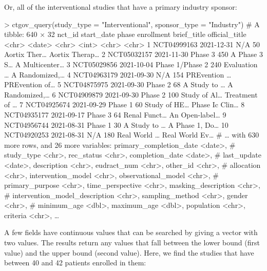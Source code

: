 Or, all of the interventional studies that have a primary industry sponsor:

\begin{example}
> ctgov_query(study_type = "Interventional", sponsor_type = "Industry")
# A tibble: 640 × 32
   nct_id      start_date phase           enrollment brief_title  official_title
   <chr>       <date>     <chr>                <int> <chr>        <chr>
 1 NCT04999163 2021-12-31 N/A                     50 Aortix Ther… Aortix Therap…
 2 NCT05032157 2021-11-30 Phase 3                450 A Phase 3 S… A Multicenter…
 3 NCT05029856 2021-10-04 Phase 1/Phase 2        240 Evaluation … A Randomized,…
 4 NCT04963179 2021-09-30 N/A                    154 PREvention … PREvention of…
 5 NCT04875975 2021-09-30 Phase 2                 68 A Study to … A Randomized,…
 6 NCT04909879 2021-09-30 Phase 2                100 Study of Al… Treatment of …
 7 NCT04925674 2021-09-29 Phase 1                 60 Study of HE… Phase Ic Clin…
 8 NCT04935177 2021-09-17 Phase 3                 64 Renal Funct… An Open-label…
 9 NCT04956744 2021-08-31 Phase 1                 30 A Study to … A Phase 1, Do…
10 NCT04920253 2021-08-31 N/A                    180 Real World … Real World Ev…
# … with 630 more rows, and 26 more variables: primary_completion_date <date>,
#   study_type <chr>, rec_status <chr>, completion_date <date>,
#   last_update <date>, description <chr>, eudract_num <chr>, other_id <chr>,
#   allocation <chr>, intervention_model <chr>, observational_model <chr>,
#   primary_purpose <chr>, time_perspective <chr>, masking_description <chr>,
#   intervention_model_description <chr>, sampling_method <chr>, gender <chr>,
#   minimum_age <dbl>, maximum_age <dbl>, population <chr>, criteria <chr>, …
\end{example}

A few fields have continuous values that can be searched by giving a vector
with two values. The results return any values that fall between the lower
bound (first value) and the upper bound (second value). Here, we find the
studies that have between 40 and 42 patients enrolled in them:

